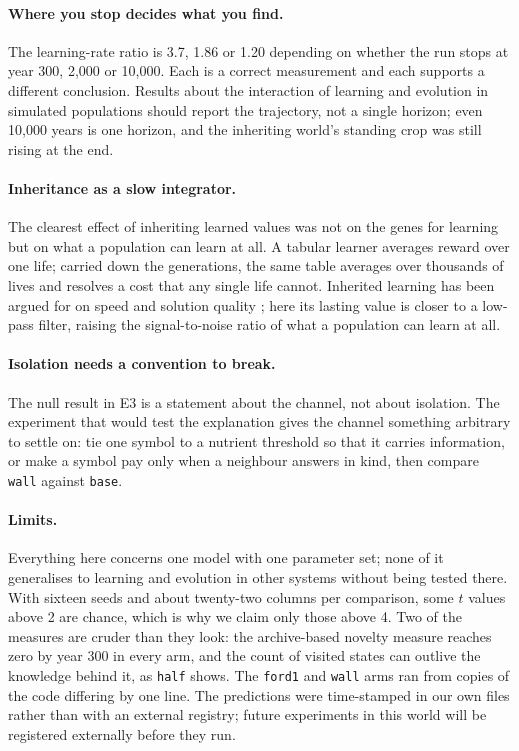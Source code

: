 \documentclass[letterpaper]{article}
\newcommand{\cond}[1]{\texttt{#1}}
\begin{document}
\paragraph{Where you stop decides what you find.} The learning-rate ratio is 3.7, 1.86 or 1.20
depending on whether the run stops at year 300, 2,000 or 10,000. Each is a correct measurement and
each supports a different conclusion. Results about the interaction of learning and evolution in
simulated populations should report the trajectory, not a single horizon; even 10,000 years is one
horizon, and the inheriting world's standing crop was still rising at the end.

\paragraph{Inheritance as a slow integrator.} The clearest effect of inheriting learned values was
not on the genes for learning but on what a population can learn at all. A tabular learner averages
reward over one life; carried down the generations, the same table averages over thousands of lives
and resolves a cost that any single life cannot. Inherited learning has been argued for on speed and
solution quality \citep{ackley1994}; here its lasting value is closer to a low-pass filter, raising the signal-to-noise
ratio of what a population can learn at all.

\paragraph{Isolation needs a convention to break.} The null result in E3 is a statement about the
channel, not about isolation. The experiment that would test the explanation gives the channel
something arbitrary to settle on: tie one symbol to a nutrient threshold so that it carries
information, or make a symbol pay only when a neighbour answers in kind, then compare \cond{wall}
against \cond{base}.

\paragraph{Limits.} Everything here concerns one model with one parameter set; none of it generalises
to learning and evolution in other systems without being tested there. With sixteen seeds and about
twenty-two columns per comparison, some $t$ values above 2 are chance, which is why we claim only
those above 4. Two of the measures are cruder than they look: the archive-based novelty measure
reaches zero by year 300 in every arm, and the count of visited states can outlive the knowledge
behind it, as \cond{half} shows. The \cond{ford1} and \cond{wall} arms ran from copies of the code
differing by one line. The predictions were time-stamped in our own files rather than with an
external registry; future experiments in this world will be registered externally before they run.
\end{document}
